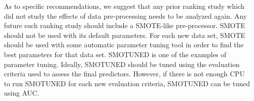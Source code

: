 \documentclass[sigconf]{acmart}
\theoremstyle{break}
\newcommand{\sma}{{\sc SMOTE}}
\newcommand{\smb}{{\sc SMOTUNED}}
\begin{document}
As to specific recommendations, we suggest that any prior ranking study  which did not  study the effects of data pre-processing needs to be analyzed again. Any future such ranking study should include a {\sma}-like
 pre-processor. {\sma} should not be used with its default parameters.
 For each new data set, {\sma} should be used with some automatic parameter tuning tool in
order to find the best parameters for that data set. {\smb} is one of the examples of parameter tuning. Ideally, {\smb} should be tuned using the evaluation criteria used to assess the final predictors. However, if there is not enough CPU to run {\smb} for each new evaluation criteria, {\smb} can be tuned using AUC.





\balance

%


 
\end{document}
